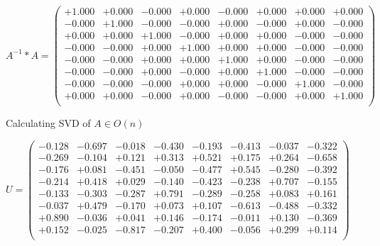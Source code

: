 \documentclass[9pt]{article}
\theoremstyle{plain}
\theoremstyle{definition}
\theoremstyle{remark}
\numberwithin{equation}{section}
\begin{document}
$A^{-1} *A = \left(
\begin{array}{
cccccccc}
+1.000 & +0.000 & -0.000 & +0.000 & -0.000 & +0.000 & +0.000 & +0.000 \\
-0.000 & +1.000 & -0.000 & -0.000 & +0.000 & -0.000 & +0.000 & -0.000 \\
+0.000 & +0.000 & +1.000 & -0.000 & +0.000 & +0.000 & -0.000 & -0.000 \\
-0.000 & -0.000 & +0.000 & +1.000 & +0.000 & +0.000 & -0.000 & -0.000 \\
-0.000 & -0.000 & +0.000 & +0.000 & +1.000 & +0.000 & -0.000 & -0.000 \\
-0.000 & -0.000 & +0.000 & -0.000 & +0.000 & +1.000 & -0.000 & -0.000 \\
-0.000 & -0.000 & -0.000 & +0.000 & +0.000 & -0.000 & +1.000 & -0.000 \\
+0.000 & +0.000 & -0.000 & +0.000 & -0.000 & -0.000 & +0.000 & +1.000 \\
\end{array}
\right)$ \newline 

Calculating SVD of  $A \in O(n)$

$U = \left(
\begin{array}{
cccccccc}
-0.128 & -0.697 & -0.018 & -0.430 & -0.193 & -0.413 & -0.037 & -0.322 \\
-0.269 & -0.104 & +0.121 & +0.313 & +0.521 & +0.175 & +0.264 & -0.658 \\
-0.176 & +0.081 & -0.451 & -0.050 & -0.477 & +0.545 & -0.280 & -0.392 \\
-0.214 & +0.418 & +0.029 & -0.140 & -0.423 & -0.238 & +0.707 & -0.155 \\
-0.133 & -0.303 & -0.287 & +0.791 & -0.289 & -0.258 & +0.083 & +0.161 \\
-0.037 & +0.479 & -0.170 & +0.073 & +0.107 & -0.613 & -0.488 & -0.332 \\
+0.890 & -0.036 & +0.041 & +0.146 & -0.174 & -0.011 & +0.130 & -0.369 \\
+0.152 & -0.025 & -0.817 & -0.207 & +0.400 & -0.056 & +0.299 & +0.114 \\
\end{array}
\right)$ \newline 
\end{document}

